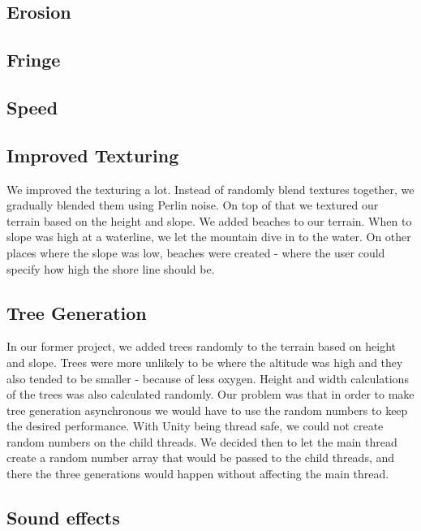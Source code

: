 \documentclass{article}
\begin{document}
\subsection{Erosion}
\label{subsec:erosion}

\subsection{Fringe}
\label{subsec:fringe}

\subsection{Speed}
\label{subsec:speed}

\subsection{Improved Texturing}
\label{subsec:texture}
We improved the texturing a lot. Instead of randomly blend textures together, we gradually blended them using Perlin noise. On top of that we textured our terrain based on the height and slope. 
We added beaches to our terrain. When to slope was high at a waterline, we let the mountain dive in to the water. On other places where the slope was low, beaches were created - where the user could specify how high the shore line should be.

\subsection{Tree Generation}
\label{subsec:tree}
In our former project, we added trees randomly to the terrain based on height and slope. Trees were more unlikely to be where the altitude was high and they also tended to be smaller - because of less oxygen. Height and width calculations of the trees was also calculated randomly.
Our problem was that in order to make tree generation asynchronous we would have to use the random numbers to keep the desired performance. With Unity being thread safe, we could not create random numbers on the child threads. We decided then to let the main thread create a random number array that would be passed to the child threads, and there the three generations would happen without affecting the main thread.

\subsection{Sound effects}
\label{subsec:sound}
\end{document}
